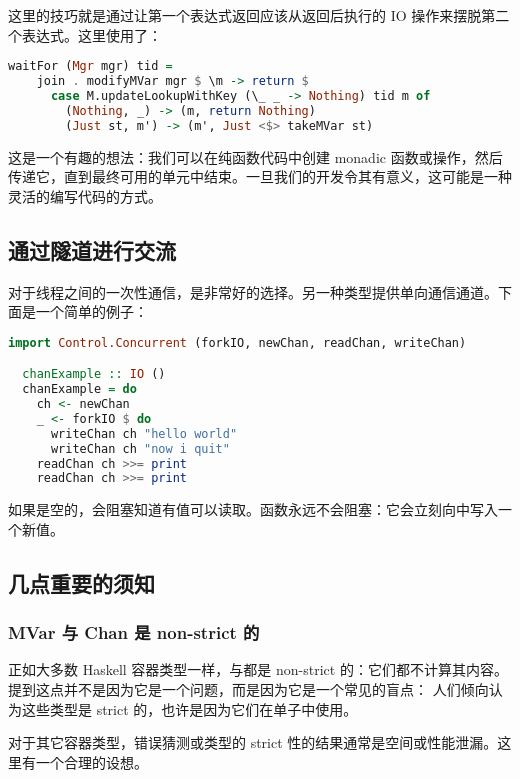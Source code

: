 \documentclass[./main.tex]{subfiles}
\begin{document}
这里的技巧就是通过让第一个表达式返回应该从返回后执行的 IO 操作来摆脱第二个表达式。这里使用了：

\begin{lstlisting}[language=Haskell]
  waitFor (Mgr mgr) tid =
    join . modifyMVar mgr $ \m -> return $
      case M.updateLookupWithKey (\_ _ -> Nothing) tid m of
        (Nothing, _) -> (m, return Nothing)
        (Just st, m') -> (m', Just <$> takeMVar st)
\end{lstlisting}

这是一个有趣的想法：我们可以在纯函数代码中创建 monadic 函数或操作，然后传递它，直到最终可用的单元中结束。一旦我们的开发令其有意义，这可能是一种灵活的编写代码的方式。

\subsection*{通过隧道进行交流}

对于线程之间的一次性通信，是非常好的选择。另一种类型提供单向通信通道。下面是一个简单的例子：

\begin{lstlisting}[language=Haskell]
  import Control.Concurrent (forkIO, newChan, readChan, writeChan)

  chanExample :: IO ()
  chanExample = do
    ch <- newChan
    _ <- forkIO $ do
      writeChan ch "hello world"
      writeChan ch "now i quit"
    readChan ch >>= print
    readChan ch >>= print
\end{lstlisting}

如果是空的，会阻塞知道有值可以读取。函数永远不会阻塞：它会立刻向中写入一个新值。

\subsection*{几点重要的须知}

\subsubsection*{MVar 与 Chan 是 non-strict 的}

正如大多数 Haskell 容器类型一样，与都是 non-strict 的：它们都不计算其内容。提到这点并不是因为它是一个问题，而是因为它是一个常见的盲点：
人们倾向认为这些类型是 strict 的，也许是因为它们在单子中使用。

对于其它容器类型，错误猜测或类型的 strict 性的结果通常是空间或性能泄漏。这里有一个合理的设想。
\end{document}
